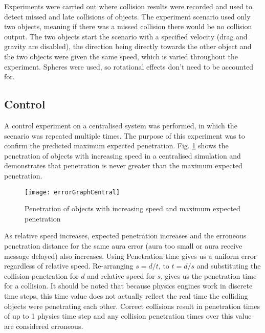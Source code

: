 


Experiments were carried out where collision results were recorded and used to detect missed and late collisions of objects. The experiment scenario used only two objects, meaning if there was a missed collision there would be no collision output. The two objects start the scenario with a specified velocity (drag and gravity are disabled), the direction being directly towards the other object and the two objects were given the same speed, which is varied throughout the experiment. Spheres were used, so rotational effects don't need to be accounted for.

\subsection{Control}

A control experiment on a centralised system was performed, in which the scenario was repeated multiple times. The purpose of this experiment was to confirm the predicted maximum expected penetration. Fig. \ref{fig_ErrorCentral} shows the penetration of objects with increasing speed in a centralised simulation and demonstrates that penetration is never greater than the maximum expected penetration.

\begin{figure}[!t]
	\centering
	\texttt{[image: errorGraphCentral]}
	\caption{Penetration of objects with increasing speed and maximum expected penetration}
	\label{fig_ErrorCentral}
\end{figure}

As relative speed increases, expected penetration increases and the erroneous penetration distance for the same aura error (aura too small or aura receive message delayed) also increases. Using Penetration time gives us a uniform error regardless of relative speed.
Re-arranging $s=d/t$, to $t=d/s$ and substituting the collision penetration for $d$ and relative speed for $s$, gives us the penetration time for a collision. It should be noted that because physics engines work in discrete time steps, this time value does not actually reflect the real time the colliding objects were penetrating each other. Correct collisions result in penetration times of up to 1 physics time step and any collision penetration times over this value are considered erroneous.

